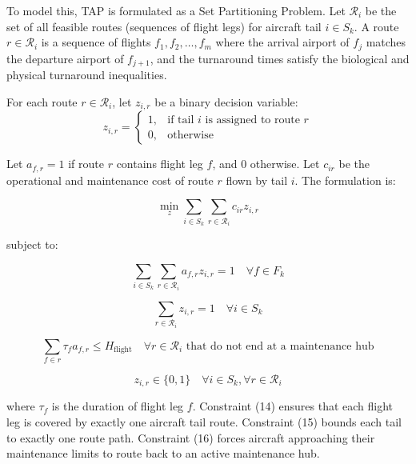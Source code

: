 \documentclass[11pt,a4paper]{book}
\begin{document}
To model this, TAP is formulated as a Set Partitioning Problem. Let $\mathcal{R}_i$ be the set of all feasible routes (sequences of flight legs) for aircraft tail $i \in S_k$. A route $r \in \mathcal{R}_i$ is a sequence of flights $f_1, f_2, \dots, f_m$ where the arrival airport of $f_j$ matches the departure airport of $f_{j+1}$, and the turnaround times satisfy the biological and physical turnaround inequalities.

For each route $r \in \mathcal{R}_i$, let $z_{i,r}$ be a binary decision variable:
\begin{equation}
z_{i,r} = \begin{cases}
1, & \text{if tail } i \text{ is assigned to route } r \\
0, & \text{otherwise}
\end{cases}
\end{equation}

Let $a_{f,r} = 1$ if route $r$ contains flight leg $f$, and $0$ otherwise. Let $c_{ir}$ be the operational and maintenance cost of route $r$ flown by tail $i$. The formulation is:

\begin{equation}
\min_z \sum_{i \in S_k} \sum_{r \in \mathcal{R}_i} c_{ir} z_{i,r}
\end{equation}

subject to:

\begin{equation}
\sum_{i \in S_k} \sum_{r \in \mathcal{R}_i} a_{f,r} z_{i,r} = 1 \quad \forall f \in F_k
\end{equation}

\begin{equation}
\sum_{r \in \mathcal{R}_i} z_{i,r} = 1 \quad \forall i \in S_k
\end{equation}

\begin{equation}
\sum_{f \in r} \tau_f a_{f,r} \leq H_{\text{flight}} \quad \forall r \in \mathcal{R}_i \text{ that do not end at a maintenance hub}
\end{equation}

\begin{equation}
z_{i,r} \in \{0, 1\} \quad \forall i \in S_k, \forall r \in \mathcal{R}_i
\end{equation}

where $\tau_f$ is the duration of flight leg $f$. Constraint (14) ensures that each flight leg is covered by exactly one aircraft tail route. Constraint (15) bounds each tail to exactly one route path. Constraint (16) forces aircraft approaching their maintenance limits to route back to an active maintenance hub.
\end{document}
